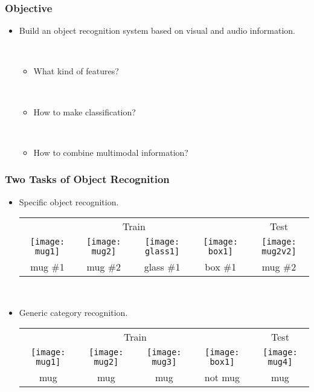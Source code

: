\documentclass{beamer}
\begin{document}
\begin{frame}
  \frametitle{Objective}

  \begin{itemize}
    \item Build an object recognition system based on visual and audio information.

      ~
      \begin{itemize}
        \item What kind of features?

          ~
        \item How to make classification?

          ~
        \item How to combine multimodal information?
      \end{itemize}
  \end{itemize}
\end{frame}

\begin{frame}
  \frametitle{Two Tasks of Object Recognition}

  \begin{itemize}
    \item Specific object recognition.
      \begin{tabular}{cccc|c}
        \multicolumn{4}{c}{Train} & Test \\
        \texttt{[image: mug1]} & \texttt{[image: mug2]} & \texttt{[image: glass1]} & \texttt{[image: box1]} & \texttt{[image: mug2v2]} \\
        mug \#1 & mug \#2 & glass \#1 & box \#1 & mug \#2 \\
      \end{tabular}

      ~
    \item Generic category recognition.
      \begin{tabular}{cccc|c}
        \multicolumn{4}{c}{Train} & Test \\
        \texttt{[image: mug1]} & \texttt{[image: mug2]} & \texttt{[image: mug3]} & \texttt{[image: box1]} & \texttt{[image: mug4]} \\
        mug & mug & mug & not mug & mug \\
      \end{tabular}

  \end{itemize}
\end{frame}
\end{document}

